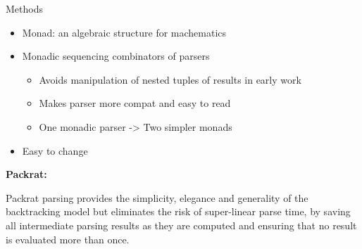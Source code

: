 \documentclass[final]{beamer}
\newlength{\onecolwid}
\newlength{\twocolwid}
\begin{document}
\begin{frame}[t]
\begin{columns}[t]
\begin{column}{\twocolwid}
\begin{columns}[t,totalwidth=\twocolwid]
\begin{column}{\onecolwid}
\begin{block}{Methods}
\begin{itemize}
\item Monad: an algebraic structure for machematics
\item Monadic sequencing combinators of parsers
\begin{itemize}
\item Avoids manipulation of nested tuples of results in early work
\item Makes parser more compat and easy to read
\item One monadic parser -> Two simpler monads
\end{itemize}
\item Easy to change

\end{itemize}


\textbf{Packrat:}

Packrat parsing provides the simplicity, elegance and generality of the backtracking model but eliminates the risk of super-linear parse time, by saving all intermediate parsing results as they are computed and ensuring that no result is evaluated more than once.



\end{block}


\end{column} %

\end{columns} %


\end{column}
\end{columns}
\end{frame}
\end{document}
